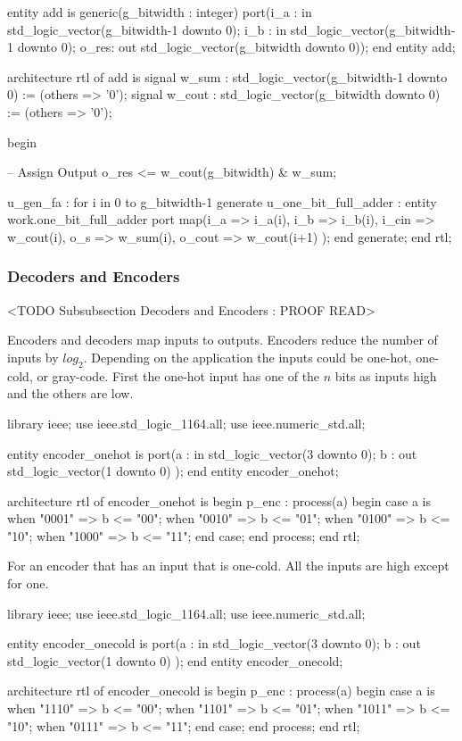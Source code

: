 \begin{VHDLlisting}[tabsize=4]
entity add is
generic(g_bitwidth : integer)
port(i_a  : in    std_logic_vector(g_bitwidth-1 downto 0);  
     i_b  : in    std_logic_vector(g_bitwidth-1 downto 0);  
	 o_res:   out std_logic_vector(g_bitwidth downto 0));
end entity add;

architecture rtl of add is 
	signal w_sum  : std_logic_vector(g_bitwidth-1 downto 0) := (others => '0'); 
	signal w_cout : std_logic_vector(g_bitwidth downto 0) := (others => '0');
	
begin 

	-- Assign Output 
	o_res <= w_cout(g_bitwidth) & w_sum; 
	
	u_gen_fa : for i in 0 to g_bitwidth-1 generate  
		u_one_bit_full_adder : entity work.one_bit_full_adder  
		port map(i_a    => i_a(i),
				 i_b    => i_b(i),
				 i_cin  => w_cout(i),
				 o_s    => w_sum(i),
				 o_cout => w_cout(i+1)
        );  
	end generate;
end rtl;
\end{VHDLlisting}


	
\subsubsection{Decoders and Encoders}
	<TODO Subsubsection  Decoders and Encoders : PROOF READ>
	
Encoders and decoders map inputs to outputs. Encoders reduce the number of inputs by $log_2$. Depending on the application the inputs could be one-hot, one-cold, or gray-code. First the one-hot input has one of the $n$ bits as inputs high and the others are low.

\begin{VHDLlisting}[tabsize=4]
library ieee;
  use ieee.std_logic_1164.all;
  use ieee.numeric_std.all;
  
entity encoder_onehot is
port(a : in    std_logic_vector(3 downto 0);
     b :   out std_logic_vector(1 downto 0)
);
end entity encoder_onehot;

architecture rtl of encoder_onehot is
begin
	p_enc : process(a)
	begin
		case a is	
			when "0001" => 
				b <= "00";
			when "0010" => 
				b <= "01";
			when "0100" => 
				b <= "10";
			when "1000" => 
				b <= "11";
		end case;
	end process;
end rtl;
\end{VHDLlisting}

For an encoder that has an input that is one-cold. All the inputs are high except for one. 

\begin{VHDLlisting}[tabsize=4]
library ieee;
  use ieee.std_logic_1164.all;
  use ieee.numeric_std.all;
  
entity encoder_onecold is
port(a : in    std_logic_vector(3 downto 0);
     b :   out std_logic_vector(1 downto 0)
);
end entity encoder_onecold;

architecture rtl of encoder_onecold is
begin
	p_enc : process(a)
	begin
		case a is	
			when "1110" => 
				b <= "00";
			when "1101" => 
				b <= "01";
			when "1011" => 
				b <= "10";
			when "0111" => 
				b <= "11";
		end case;
	end process;
end rtl;
\end{VHDLlisting}
	
